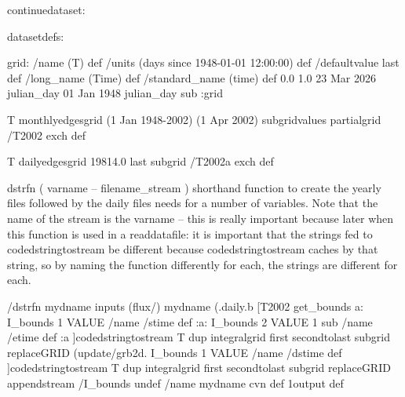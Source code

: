 \begin{ingrid}

continuedataset:

datasetdefs:

grid:
/name (T) def
/units (days since 1948-01-01 12:00:00) def
/defaultvalue { last } def
/long_name (Time) def
/standard_name (time) def
0.0
1.0
23 Mar 2026 julian_day
01 Jan 1948 julian_day sub
:grid

T monthlyedgesgrid
(1 Jan 1948-2002) (1 Apr 2002) subgridvalues
partialgrid
/T2002 exch def

T dailyedgesgrid
19814.0 last subgrid
/T2002a exch def

\end{ingrid}

\word dstrfn ( varname -- filename_stream ) shorthand function to
create the yearly files followed by the daily files needs for a number
of variables.  Note that the name of the stream is the varname -- this
is really important because later when this function is used in a
readdatafile: it is important that the strings fed to
codedstringtostream be different because codedstringtostream caches by
that string, so by naming the function differently for each, the
strings are different for each. 

\begin{ingrid}

/dstrfn {
{mydname} inputs
   (flux/) mydname (.daily.b%
   [T2002 get_bounds a:
        I_bounds 1 VALUE
        /name /stime def
        :a:
         I_bounds 2 VALUE
         1 sub
         /name /etime def
         :a
       ]codedstringtostream
   T dup integralgrid
     first secondtolast subgrid
     replaceGRID
   (update/grb2d.%
       I_bounds 1 VALUE
       /name /dstime def
       ]codedstringtostream
    T dup integralgrid
      first secondtolast subgrid
      replaceGRID
    appendstream
/I_bounds undef   /name mydname cvn def
1output
} def

\end{ingrid}

